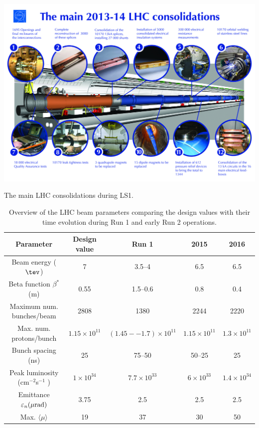 \bfig[t!]
\includegraphics[width=\textwidth]{figures/Detector/LHCconsolidationsEng.jpg}
\captionsetup{width=0.85\textwidth} \caption{\small The main LHC consolidations during LS1.}
\label{sec:det:fig:consolidations}
\efig


\begin{table}
\footnotesize
\begin{center}
\begin{tabular}{c|c|c|c|c}
  \hline \hline
  Parameter & Design value & Run 1 & 2015 & 2016 \\
  \hline
  Beam energy ($\tev$) & 7 & 3.5--4 & 6.5 & 6.5 \\
  Beta function $\beta^{*}$ (m) & 0.55 & 1.5--0.6 & 0.8 & 0.4 \\
  Maximum num. bunches/beam & 2808 & 1380 & 2244 & 2220 \\
  Max. num. protons/bunch & $1.15\times10^{11}$ & $(1.45--1.7)\times10^{11}$ & $1.15\times10^{11}$ & $1.3\times10^{11}$\\ 
  Bunch spacing (ns) & 25 & 75--50 & 50--25 & 25 \\
  Peak luminosity (cm$^{-2}$s$^{-1}$ ) & $1\times10^{34}$  & $7.7\times10^{33}$  & $6\times10^{33}$  & $1.4\times10^{34}$  \\
  Emittance $\epsilon_{n} (\mu {\rm rad})$ & 3.75 & 2.5 & 2.5& 2.5 \\
 Max. $\langle\mu\rangle$ & 19 & 37 & 30 & 50 \\
  \hline\hline

\end{tabular}
\captionsetup{width=0.85\textwidth} \caption{\small Overview of the LHC beam parameters comparing the design values with their time evolution during Run 1 and early Run 2 operations.}
\label{sec:det:tab:LHCparam}
\end{center}
\end{table}
